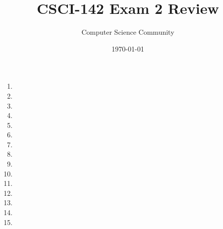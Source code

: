 \documentclass[11pt]{article}
\title{CSCI-142 Exam 2 Review}
\author{Computer Science Community}
\date{\today}
\begin{document}
\header
\begin{enumerate}

\item 

\item 

\item 

\item 

\item 

\item 

\item 

\newpage
\item 

\item 

\item 

\newpage
\item 

\newpage
\item 

\item 

\item 

\newpage
\item 

\end{enumerate}
\end{document}
